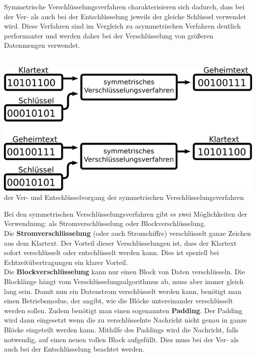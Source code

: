 \documentclass[12pt,a4paper]{report}
\begin{document}
\begin{onehalfspace}
Symmetrische Verschlüsselungsverfahren charakterisieren sich dadurch, dass bei der Ver- als auch bei der Entschlüsselung jeweils der gleiche Schlüssel verwendet wird. Diese Verfahren sind im Vergleich zu asymmetrischen Verfahren deutlich performanter und werden daher bei der Verschlüsselung von größeren Datenmengen verwendet.\\\\

\begin{center}
\includegraphics[scale=3]{img/sym.png}\\
der Ver- und Entschlüsselvorgang der symmetrischen Verschlüsselungsverfahren
\end{center}

Bei den symmetrischen Verschlüsselungsverfahren gibt es zwei Möglichkeiten der Verwendnung: als Stromverschlüsselung oder Blockverschlüsselung.\\
Die \textbf{Stromverschlüsselung} (oder auch Stromchiffre) verschlüsselt ganze Zeichen aus dem Klartext. Der Vorteil dieser Verschlüsselungen ist, dass der Klartext sofort verschlüsselt oder entschlüsselt werden kann. Dies ist speziell bei Echtzeitübertragungen ein klarer Vorteil.\\
Die \textbf{Blockverschlüsselung} kann nur einen Block von Daten verschlüsseln. Die Blocklänge hängt vom Verschlüsselungsalgorithmus ab, muss aber immer gleich lang sein. Damit nun ein Datenstrom verschlüsselt werden kann, benötigt man einen Betriebsmodus, der angibt, wie die Blöcke untereinander verschlüsselt werden sollen. Zudem benötigt man einen sogenannten \textbf{Padding}. Der Padding wird dann eingesetzt wenn die zu verschlüsselnte Nachricht nicht genau in ganze Blöcke eingeteilt werden kann. Mithilfe des Paddings wird die Nachricht, falls notwendig, auf einen neuen vollen Block aufgefüllt. Dies muss bei der Ver- als auch bei der Entschlüsselung beachtet werden.\\


\end{onehalfspace}
\end{document}

